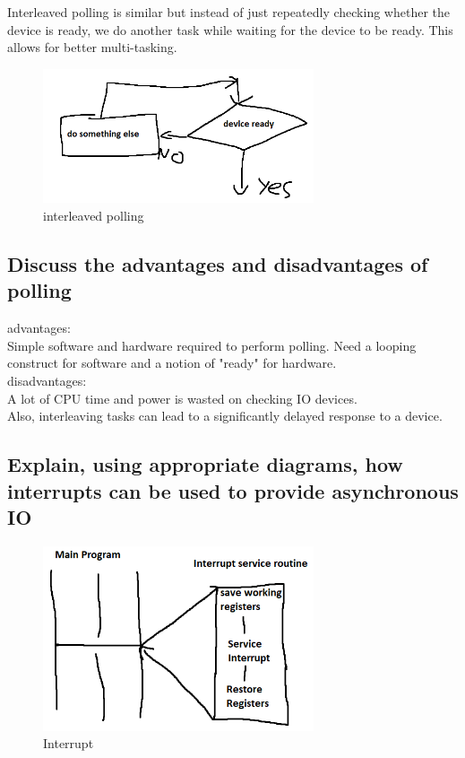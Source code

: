 \documentclass{article}
\begin{document}
Interleaved polling is similar but instead of just repeatedly checking whether the device is ready, we do another task while waiting for the device to be ready. This allows for better multi-tasking.
\begin{figure}[h]
    \centering
    \includegraphics[width = 80mm]{IO.PNG}
    \caption{interleaved polling}
    \label{fig:my_label}
\end{figure}

\subsection{Discuss the advantages and disadvantages of polling}
advantages:\\
Simple software and hardware required to perform polling. Need a looping construct for software and a notion of "ready" for hardware.\\
disadvantages:\\
A lot of CPU time and power is wasted on checking IO devices.\\
Also, interleaving tasks can lead to a significantly delayed response to a device.

\subsection{Explain, using appropriate diagrams, how interrupts can be used to provide asynchronous IO}
\begin{figure}[h]
    \centering
    \includegraphics[width = 80mm]{IO2.PNG}
    \caption{Interrupt}
    \label{fig:my_label}
\end{figure}
\end{document}
